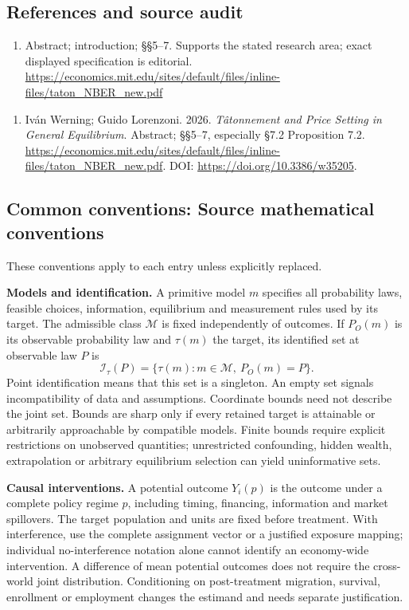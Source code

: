 \documentclass[11pt,a4paper]{article}
\begin{document}
\subsection*{References and source audit}
\begin{enumerate}
\item Abstract; introduction; §§5–7. Supports the stated research area; exact displayed specification is editorial. \url{https://economics.mit.edu/sites/default/files/inline-files/taton_NBER_new.pdf}
\end{enumerate}
\begin{enumerate}\raggedright
\item\hypertarget{definitions:source:30007552:1}{} Iván Werning; Guido Lorenzoni. 2026. \emph{Tâtonnement and Price Setting in General Equilibrium}. Abstract; §§5–7, especially §7.2 Proposition 7.2.
\url{https://economics.mit.edu/sites/default/files/inline-files/taton_NBER_new.pdf}.
DOI: \url{https://doi.org/10.3386/w35205}.
\end{enumerate}

\subsection*{Common conventions: Source mathematical conventions}

These conventions apply to each entry unless explicitly replaced.

\textbf{Models and identification.} A primitive model \(m\) specifies all probability laws, feasible choices, information, equilibrium and measurement rules used by its target. The admissible class \(\mathcal M\) is fixed independently of outcomes. If \(P_O(m)\) is its observable probability law and \(\tau(m)\) the target, its identified set at observable law \(P\) is
\[
 \mathcal I_\tau(P)=\{\tau(m):m\in\mathcal M,\ P_O(m)=P\}.
\]
Point identification means that this set is a singleton. An empty set signals incompatibility of data and assumptions. Coordinate bounds need not describe the joint set. Bounds are sharp only if every retained target is attainable or arbitrarily approachable by compatible models. Finite bounds require explicit restrictions on unobserved quantities; unrestricted confounding, hidden wealth, extrapolation or arbitrary equilibrium selection can yield uninformative sets.

\textbf{Causal interventions.} A potential outcome \(Y_i(p)\) is the outcome under a complete policy regime \(p\), including timing, financing, information and market spillovers. The target population and units are fixed before treatment. With interference, use the complete assignment vector or a justified exposure mapping; individual no-interference notation alone cannot identify an economy-wide intervention. A difference of mean potential outcomes does not require the cross-world joint distribution. Conditioning on post-treatment migration, survival, enrollment or employment changes the estimand and needs separate justification.
\end{document}
